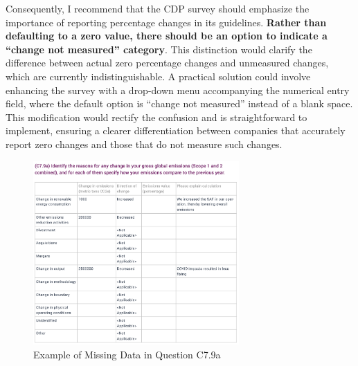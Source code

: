 Consequently, I recommend that the CDP survey should emphasize the importance of reporting percentage changes in its guidelines. \textbf{Rather than defaulting to a zero value, there should be an option to indicate a ``change not measured'' category}. This distinction would clarify the difference between actual zero percentage changes and unmeasured changes, which are currently indistinguishable. A practical solution could involve enhancing the survey with a drop-down menu accompanying the numerical entry field, where the default option is ``change not measured'' instead of a blank space. This modification would rectify the confusion and is straightforward to implement, ensuring a clearer differentiation between companies that accurately report zero changes and those that do not measure such changes.


\begin{figure}[H]
    \centering
    \includegraphics[width=0.7\textwidth]{thesis_tex/figures/cdp_missing.png}
    \caption{Example of Missing Data in Question C7.9a}
    \label{fig:missing_data}
\end{figure}







